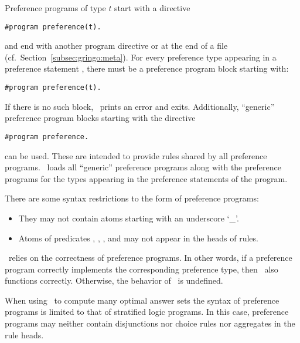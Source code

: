 \begin{note}
Preference programs of type $t$ start with a directive
\begin{lstlisting}[numbers=none]
#program preference(t).
\end{lstlisting}
and end with another program directive or at the end of a file
(cf.~Section~\ref{subsec:gringo:meta}).
For every preference type  appearing in a preference statement , 
there must be a preference program block starting with:
\begin{lstlisting}[numbers=none]
#program preference(t).
\end{lstlisting}
If there is no such block, \asprin\ prints an error and exits.
Additionally, ``generic'' preference program blocks starting with the directive
\begin{lstlisting}[numbers=none]
#program preference.
\end{lstlisting}
can be used. 
These are intended to provide rules shared by all preference programs.
\asprin\ loads all ``generic'' preference programs along with 
the preference programs for the types appearing in the preference statements of the program.
\end{note}

\begin{note}
There are some syntax restrictions to the form of preference programs:
\begin{itemize}
\item They may not contain atoms starting with an underscore `\_'.
\item Atoms of predicates , , 
      ,  and 
      may not appear in the heads of rules.
\end{itemize}
\end{note}

\begin{note}
\asprin\ relies on the correctness of preference programs. 
In other words, 
if a preference program correctly implements the corresponding preference type,
then \asprin\ also functions correctly.
Otherwise, the behavior of \asprin\ is undefined.
\end{note}

\begin{note}
When using \asprin\ to compute many optimal answer sets the syntax of preference programs
is limited to that of stratified logic programs.
In this case, preference programs may neither contain disjunctions 
nor choice rules nor aggregates in the rule heads.
\end{note}

